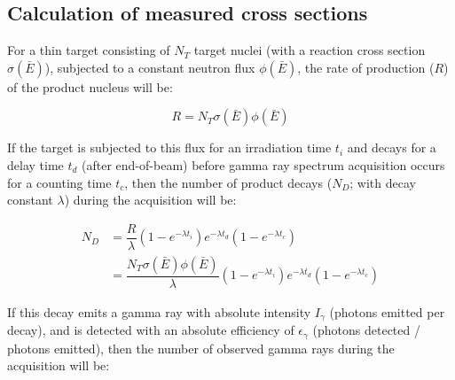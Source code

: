 \documentclass[5p]{elsarticle}
\newcommand{\pp}[1]{\left( #1\right)}
\newcommand{\comment}[1]{\todo[color=blue!20!white,inline]{ASV: #1}}
\begin{document}




\subsection{Calculation of measured cross sections}\label{sec:calcs_sec}


For a thin target consisting of \(N_T\) target nuclei (with a reaction cross section $\sigma\pp{\bar{E}}$), subjected to a constant neutron flux $\phi\pp{\bar{E}}$, the rate of production ($R$) of the product nucleus will be:

\begin{equation}
R = N_T \sigma\pp{\bar{E}} \phi\pp{\bar{E}} 
\end{equation}

If the target is subjected to this flux  for an irradiation  time $t_i$ and decays for a  delay time $t_d$ (after end-of-beam) before gamma ray spectrum acquisition occurs for a counting time  $t_c$, then the number of product decays ($N_D$; with decay constant $\lambda$) during the acquisition will be:


\begin{align}
N_D &= \dfrac{R}{\lambda}\pp{1 - e^{-\lambda t_i}} e^{-\lambda t_d} \pp{1 - e^{-\lambda t_c}}
\\
&= \dfrac{N_T \sigma\pp{\bar{E}} \phi\pp{\bar{E}} }{\lambda}\pp{1 - e^{-\lambda t_i}} e^{-\lambda t_d} \pp{1 - e^{-\lambda t_c}} \nonumber
\end{align}


If this decay emits a gamma ray with absolute intensity $I_\gamma$ (photons emitted per decay), and is detected with an absolute efficiency  of $\epsilon_\gamma$ (photons detected / photons emitted), then the number of observed gamma rays during the acquisition will be:

\end{document}
